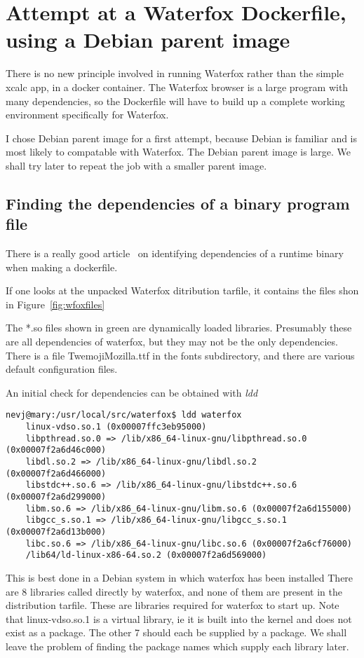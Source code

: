 \documentclass{article}  %
\begin{document}
\section{Attempt at a Waterfox Dockerfile, using a  Debian parent image}
There is no new principle involved in running Waterfox rather than the simple xcalc app, in a docker container. The Waterfox browser is a large program with many dependencies, so the Dockerfile will have to build up a complete working environment specifically for Waterfox. 

I chose Debian parent image for a first attempt, because Debian is familiar and is most likely to compatable with Waterfox.  The Debian parent image is large. We shall try later to repeat the job with a smaller parent image. 

\subsection{Finding the dependencies of a binary program file}
There is a really good article~\cite{rehn:21} on identifying dependencies of a runtime binary when making a dockerfile.

If one looks at the unpacked Waterfox ditribution tarfile, it contains the files shon in Figure~\ref{fig:wfoxfiles}

The *.so files shown in green are dynamically loaded libraries. Presumably these are all dependencies of waterfox, but they may not be the only dependencies. There is a file TwemojiMozilla.ttf in the fonts subdirectory, and there are various default configuration files.

An initial check for dependencies can be obtained with {\em ldd}
\begin{verbatim}
nevj@mary:/usr/local/src/waterfox$ ldd waterfox
	linux-vdso.so.1 (0x00007ffc3eb95000)
	libpthread.so.0 => /lib/x86_64-linux-gnu/libpthread.so.0 (0x00007f2a6d46c000)
	libdl.so.2 => /lib/x86_64-linux-gnu/libdl.so.2 (0x00007f2a6d466000)
	libstdc++.so.6 => /lib/x86_64-linux-gnu/libstdc++.so.6 (0x00007f2a6d299000)
	libm.so.6 => /lib/x86_64-linux-gnu/libm.so.6 (0x00007f2a6d155000)
	libgcc_s.so.1 => /lib/x86_64-linux-gnu/libgcc_s.so.1 (0x00007f2a6d13b000)
	libc.so.6 => /lib/x86_64-linux-gnu/libc.so.6 (0x00007f2a6cf76000)
	/lib64/ld-linux-x86-64.so.2 (0x00007f2a6d569000)
\end{verbatim}
This is best done in a Debian system in which waterfox has been installed
There are 8 libraries called directly by waterfox, and none of them are present in the distribution tarfile. These are libraries required for waterfox to start up. Note that linux-vdso.so.1 is a virtual library, ie it is built into the kernel and does not exist as a package. The other 7 should each be supplied by a package. We shall leave the problem of finding the package names which supply each library later.
\end{document}
